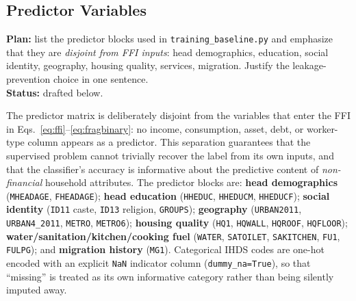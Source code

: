 \documentclass[colorlinks,balance]{asmeconf}
\begin{document}
\subsection{Predictor Variables}
\begin{outline}
\textbf{Plan:} list the predictor blocks used in \texttt{training\_baseline.py} and emphasize that they are \emph{disjoint from FFI inputs}: head demographics, education, social identity, geography, housing quality, services, migration. Justify the leakage-prevention choice in one sentence.\\
\textbf{Status:} drafted below.
\end{outline}
The predictor matrix is deliberately disjoint from the variables that enter the FFI in Eqs.~\eqref{eq:ffi}--\eqref{eq:fragbinary}: no income, consumption, asset, debt, or worker-type column appears as a predictor. This separation guarantees that the supervised problem cannot trivially recover the label from its own inputs, and that the classifier's accuracy is informative about the predictive content of \emph{non-financial} household attributes. The predictor blocks are: \textbf{head demographics} (\texttt{MHEADAGE}, \texttt{FHEADAGE}); \textbf{head education} (\texttt{HHEDUC}, \texttt{HHEDUCM}, \texttt{HHEDUCF}); \textbf{social identity} (\texttt{ID11} caste, \texttt{ID13} religion, \texttt{GROUPS}); \textbf{geography} (\texttt{URBAN2011}, \texttt{URBAN4\_2011}, \texttt{METRO}, \texttt{METRO6}); \textbf{housing quality} (\texttt{HQ1}, \texttt{HQWALL}, \texttt{HQROOF}, \texttt{HQFLOOR}); \textbf{water/sanitation/kitchen/cooking fuel} (\texttt{WATER}, \texttt{SATOILET}, \texttt{SAKITCHEN}, \texttt{FU1}, \texttt{FULPG}); and \textbf{migration history} (\texttt{MG1}). Categorical IHDS codes are one-hot encoded with an explicit \texttt{NaN} indicator column (\texttt{dummy\_na=True}), so that ``missing'' is treated as its own informative category rather than being silently imputed away.
\end{document}

